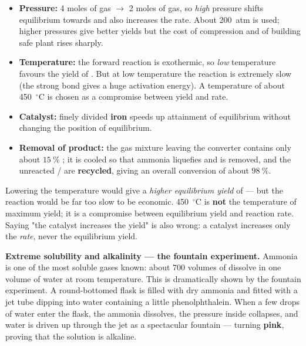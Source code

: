 \documentclass[11pt]{article}
\newcommand{\cle}[1]{{\popxbold\color{popdark}#1}}
\newcounter{popsec}
\newcounter{popsub}
\newcommand{\courssub}[1]{%
  \stepcounter{popsub}%
  \par\vspace{9pt}\noindent{\popxbold\fontsize{11.5}{13}\selectfont\color{popink}{\color{poporange}\thepopsec.\thepopsub}\hspace{6pt}#1}\par\nopagebreak\vspace{4pt}
}
\begin{document}
\begin{itemize}
\item \textbf{Pressure:} 4 moles of gas $\rightarrow$ 2 moles of gas, so \emph{high} pressure shifts equilibrium towards  and also increases the rate. About \SI{200}{atm} is used; higher pressures give better yields but the cost of compression and of building safe plant rises sharply.
\item \textbf{Temperature:} the forward reaction is exothermic, so \emph{low} temperature favours the yield of . But at low temperature the reaction is extremely slow (the strong  bond gives a huge activation energy). A temperature of about \SI{450}{\ensuremath{{}^{\circ}\mathrm{C}}} is chosen as a \cle{compromise} between yield and rate.
\item \textbf{Catalyst:} finely divided \textbf{iron} speeds up attainment of equilibrium without changing the position of equilibrium.
\item \textbf{Removal of product:} the gas mixture leaving the converter contains only about $15\ \%$ ; it is cooled so that ammonia liquefies and is removed, and the unreacted / are \textbf{recycled}, giving an overall conversion of about $98\ \%$.
\end{itemize}

\begin{attention}
Lowering the temperature would give a \emph{higher equilibrium yield} of  — but the reaction would be far too slow to be economic. \SI{450}{\ensuremath{{}^{\circ}\mathrm{C}}} is \textbf{not} the temperature of maximum yield; it is a compromise between equilibrium yield and reaction rate. Saying "the catalyst increases the yield" is also wrong: a catalyst increases only the \emph{rate}, never the equilibrium yield.
\end{attention}

\courssub{Properties of Ammonia}

\textbf{Extreme solubility and alkalinity — the fountain experiment.} Ammonia is one of the most soluble gases known: about $700$ volumes of  dissolve in one volume of water at room temperature. This is dramatically shown by the \cle{fountain experiment}. A round-bottomed flask is filled with dry ammonia and fitted with a jet tube dipping into water containing a little phenolphthalein. When a few drops of water enter the flask, the ammonia dissolves, the pressure inside collapses, and water is driven up through the jet as a spectacular fountain — turning \textbf{pink}, proving that the solution is alkaline.
\end{document}
